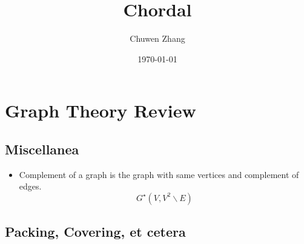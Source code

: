 \documentclass[../main]{subfiles}
\title{Chordal}
\author{Chuwen Zhang}
\date{\today}
\begin{document}
% 
% 
% 
% 
% 
% 


\section{Graph Theory Review}

\subsection{Miscellanea}
\begin{itemize}
      \item Complement of a graph is the graph with same vertices and complement of edges.
            \[G^\star\left(V, V^2 \backslash E\right)\]

\end{itemize}
\subsection{Packing, Covering, et cetera}
\end{document}
